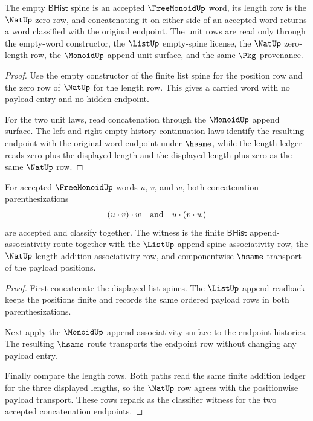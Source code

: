\begin{theorem}
\label{thm:freemonoid-empty-word-unit}
The empty $\mathsf{BHist}$ spine is an accepted $\FreeMonoidUp$ word, its
length row is the $\NatUp$ zero row, and concatenating it on either side of an
accepted word returns a word classified with the original endpoint. The unit
rows are read only through the empty-word constructor, the $\ListUp$ empty-spine
license, the $\NatUp$ zero-length row, the $\MonoidUp$ append unit surface, and
the same $\Pkg$ provenance.
\end{theorem}
\begin{proof}
Use the empty constructor of the finite list spine for the position row and the
zero row of $\NatUp$ for the length row. This gives a carried word with no
payload entry and no hidden endpoint.

For the two unit laws, read concatenation through the $\MonoidUp$ append
surface. The left and right empty-history continuation laws identify the
resulting endpoint with the original word endpoint under $\hsame$, while the
length ledger reads zero plus the displayed length and the displayed length
plus zero as the same $\NatUp$ row.
\end{proof}

\begin{theorem}
\label{thm:freemonoid-concat-associativity}
For accepted $\FreeMonoidUp$ words $u$, $v$, and $w$, both concatenation
parenthesizations
$$
(u\cdot v)\cdot w
\quad\hbox{and}\quad
u\cdot (v\cdot w)
$$
are accepted and classify together. The witness is the finite
$\mathsf{BHist}$ append-associativity route together with the $\ListUp$
append-spine associativity row, the $\NatUp$ length-addition associativity row,
and componentwise $\hsame$ transport of the payload positions.
\end{theorem}
\begin{proof}
First concatenate the displayed list spines. The $\ListUp$ append readback
keeps the positions finite and records the same ordered payload rows in both
parenthesizations.

Next apply the $\MonoidUp$ append associativity surface to the endpoint
histories. The resulting $\hsame$ route transports the endpoint row without
changing any payload entry.

Finally compare the length rows. Both paths read the same finite addition
ledger for the three displayed lengths, so the $\NatUp$ row agrees with the
positionwise payload transport. These rows repack as the classifier witness for
the two accepted concatenation endpoints.
\end{proof}


